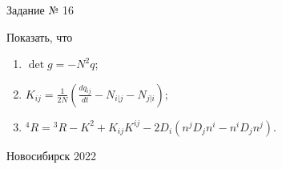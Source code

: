 \documentclass[12pt,pagesize,paper=192mm:108mm,landscape]{scrbook}
\begin{document}
\begin{titlepage}
  \vspace*{-0.5em}
  \begin{center}    




    \vfill
    \Large
    Задание № 16
 \bigskip

    \normalsize
    \begin{minipage}{0.65\linewidth}
        Показать, что 
      \begin{enumerate}
      \item  $\det g = - N^2 q$;
      \item  $K_{ij} = \frac{1}{2N}\left (\frac{dq_{ij}}{dt} - N_{i|j} - N_{j|i}\right);$
      \item  \({}^4\!R = {}^3\!R - K^2 + K_{ij}K^{ij} - 2D_i(n^jD_jn^i - n^iD_jn^j).\)
      \end{enumerate}
    \end{minipage}
    \vfill

     \normalsize \ccbysa\hspace{0.5em}  Новосибирск 2022
  \end{center}
\end{titlepage}
\end{document}
